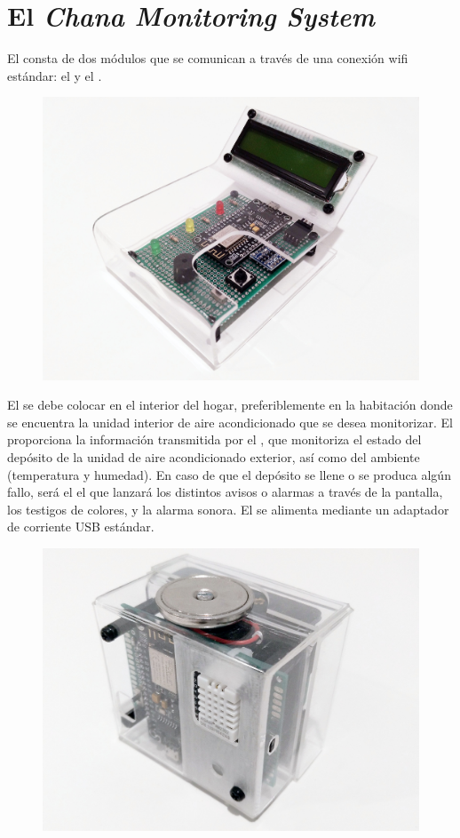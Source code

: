 \section{El \textit{Chana Monitoring System}}
\label{sect:intro}

El \CMS consta de dos módulos que se comunican a través de una conexión wifi estándar: el \MIE y el \MEE.

\begingroup

\setlength{\columnsep}{6pt}
\setlength{\intextsep}{6pt}

\begin{figure}
  \centering
  \includegraphics[width=0.5\columnwidth]{../photos/interior.jpg}
\end{figure}

El \MIE se debe colocar en el interior del hogar, preferiblemente en la habitación donde se encuentra la unidad interior de aire acondicionado que se desea monitorizar.
El \MI proporciona la información transmitida por el \ME, que monitoriza el estado del depósito de la unidad de aire acondicionado exterior, así como del ambiente (temperatura y humedad).
En caso de que el depósito se llene o se produca algún fallo, será el \MI el que lanzará los distintos avisos o alarmas a través de la pantalla, los testigos de colores, y la alarma sonora.
El \MI se alimenta mediante un adaptador de corriente USB estándar.

\begin{figure}
  \centering
  \includegraphics[width=0.5\columnwidth]{../photos/exterior.jpg}
\end{figure}

